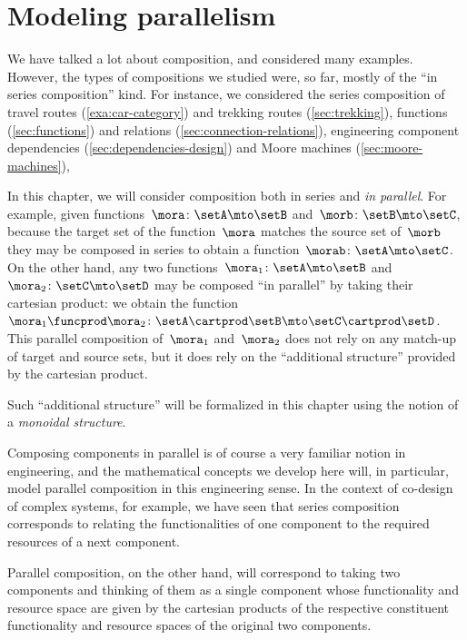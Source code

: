
\section{Modeling parallelism}
\label{sec:modeling-parallelism}

We have talked a lot about composition, and considered many examples.
However, the types of compositions we studied were, so far, mostly of the ``in series composition'' kind.
For instance, we considered the series composition of travel routes (\cref{exa:car-category}) and trekking routes (\cref{sec:trekking}), functions (\cref{sec:functions}) and relations (\cref{sec:connection-relations}), engineering component dependencies (\cref{sec:dependencies-design}) and Moore machines (\cref{sec:moore-machines}), \etc

In this chapter, we will consider composition both in series and \emph{in parallel}.
For example, given functions~$\mora\colon \setA \mto \setB$ and~$\morb\colon \setB \mto \setC$, because the target set of the function~$\mora$ matches the source set of~$\morb$ they may be composed in series to obtain a function~$\morab\colon \setA \mto \setC$.
On the other hand, any two functions~$\mora_1 \colon \setA \mto \setB$ and~$\mora_2 \colon \setC \mto \setD$ may be composed ``in parallel'' by taking their cartesian product: we obtain the function~$\mora_1 \funcprod \mora_2\colon \setA \cartprod \setB \mto \setC \cartprod \setD$.
This parallel composition of~$\mora_1$ and~$\mora_2$ does not rely on any match-up of target and source sets, but it does rely on the ``additional structure'' provided by the cartesian product.

Such ``additional structure'' will be formalized in this chapter using the notion of a \emph{monoidal structure}.

Composing components in parallel is of course a very familiar notion in engineering, and the mathematical concepts we develop here will, in particular, model parallel composition in this engineering sense.
In the context of co-design of complex systems, for example, we have seen that series composition corresponds to relating the functionalities of one component to the required resources of a next component.


Parallel composition, on the other hand, will correspond to taking two components and thinking of them as a single component whose functionality and resource space are given by the cartesian products of the respective constituent functionality and resource spaces of the original two components.

